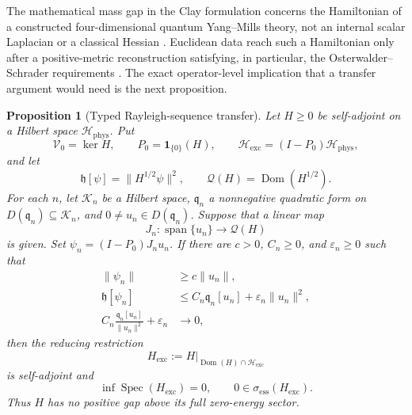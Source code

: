 \documentclass[11pt]{article}
\numberwithin{equation}{section}
\newtheorem{proposition}[theorem]{Proposition}
\theoremstyle{definition}
\theoremstyle{remark}
\newcommand{\Spec}{\operatorname{Spec}}
\begin{document}
The mathematical mass gap in the Clay formulation concerns the Hamiltonian
of a constructed four-dimensional quantum Yang--Mills theory, not an internal
scalar Laplacian or a classical Hessian \citep{JaffeWitten_2006}.  Euclidean
data reach such a Hamiltonian only after a positive-metric reconstruction
satisfying, in particular, the Osterwalder--Schrader requirements
\citep{OsterwalderSchrader_1973,OsterwalderSchrader_1975}.  The exact
operator-level implication that a transfer argument would need is the next
proposition.

\begin{proposition}[Typed Rayleigh-sequence transfer]
\label{prop:typed-physical-transfer}
Let $H\ge0$ be self-adjoint on a Hilbert space $\mathcal H_{\mathrm{phys}}$.
Put
\begin{equation}\label{eq:physical-excitation-space}
 \mathcal V_0=\ker H,\qquad P_0=\mathbf1_{\{0\}}(H),\qquad
 \mathcal H_{\mathrm{exc}}=(I-P_0)\mathcal H_{\mathrm{phys}},
\end{equation}
and let
\begin{equation}\label{eq:physical-energy-form}
 \mathfrak h[\psi]=\|H^{1/2}\psi\|^2,
 \qquad \mathcal Q(H)=\operatorname{Dom}(H^{1/2}).
\end{equation}
For each $n$, let $\mathcal K_n$ be a Hilbert space,
$\mathfrak q_n$ a nonnegative quadratic form on
$D(\mathfrak q_n)\subseteq\mathcal K_n$, and
$0\ne u_n\in D(\mathfrak q_n)$.  Suppose that a linear map
\[
 J_n:\operatorname{span}\{u_n\}\longrightarrow\mathcal Q(H)
\]
is given.  Set $\psi_n=(I-P_0)J_nu_n$.  If there are $c>0$, $C_n\ge0$,
and $\varepsilon_n\ge0$ such that
\begin{align}
 \|\psi_n\|&\ge c\|u_n\|,
 \label{eq:bridge-norm}\\
 \mathfrak h[\psi_n]
 &\le C_n\mathfrak q_n[u_n]+\varepsilon_n\|u_n\|^2,
 \label{eq:bridge-energy}\\
 C_n\frac{\mathfrak q_n[u_n]}{\|u_n\|^2}+\varepsilon_n
 &\longrightarrow0,
 \label{eq:bridge-smallness}
\end{align}
then the reducing restriction
\[
 H_{\mathrm{exc}}
 :=H\big|_{\operatorname{Dom}(H)\cap\mathcal H_{\mathrm{exc}}}
\]
is self-adjoint and
\begin{equation}\label{eq:bridge-conclusion}
 \inf\Spec(H_{\mathrm{exc}})=0,
 \qquad 0\in\sigma_{\mathrm{ess}}(H_{\mathrm{exc}}).
\end{equation}
Thus $H$ has no positive gap above its full zero-energy sector.
\end{proposition}
\end{document}
